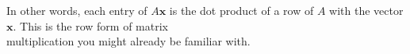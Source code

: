 \documentclass[preview]{standalone}
\begin{document}
\begin{center}
In other words, each entry of $A\mathbf{x}$ is the dot product of a row of $A$ with the vector $\mathbf{x}$. This is the row form of matrix \\multiplication you might already be familiar with.
\end{center}
\end{document}

